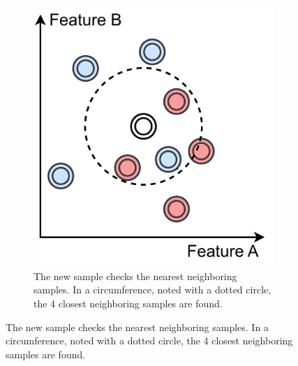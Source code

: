 \begin{figure}[htb]
{\begin{subfigure}[b]{0.37\textwidth}
             \end{subfigure}
             \hspace{0.015\textwidth}
             \begin{subfigure}[b]{0.37\textwidth}
                 \centering
                 \includegraphics[width=\textwidth]{images/knn_2}
                 \caption{The new sample checks the nearest neighboring samples. In a circumference, noted with a dotted circle, the 4 closest neighboring samples are found.}
                

\end{subfigure}}
\end{figure}
